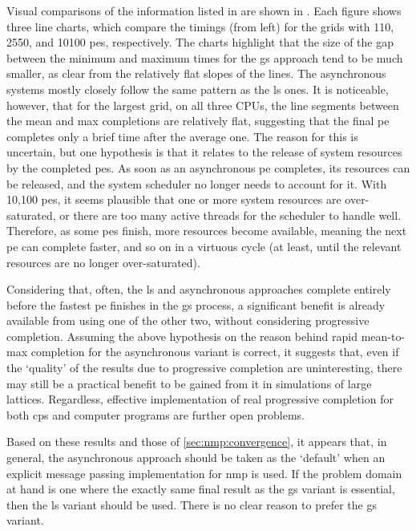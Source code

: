 Visual comparisons of the information listed in  are shown in .  Each figure shows three line charts, which compare the timings (from left) for the grids with \num{110}, \num{2 550}, and \num{10 100} \glspl{pe}, respectively.  The charts highlight that the size of the gap between the minimum and maximum times for the \gls{gs} approach tend to be much smaller, as clear from the relatively flat slopes of the lines.  The asynchronous systems mostly closely follow the same pattern as the \gls{ls} ones.  It is noticeable, however, that for the largest grid, on all three CPUs, the line segments between the mean and max completions are relatively flat, suggesting that the final \gls{pe} completes only a brief time after the average one.  The reason for this is uncertain, but one hypothesis is that it relates to the release of system resources by the completed \glspl{pe}.  As soon as an asynchronous \gls{pe} completes, its resources can be released, and the system scheduler no longer needs to account for it.  With 10,100 \glspl{pe}, it seems plausible that one or more system resources are over-saturated, or there are too many active threads for the scheduler to handle well.  Therefore, as some \glspl{pe} finish, more resources become available, meaning the next \gls{pe} can complete faster, and so on in a virtuous cycle (at least, until the relevant resources are no longer over-saturated).

Considering that, often, the \gls{ls} and asynchronous approaches complete entirely before the fastest \gls{pe} finishes in the \gls{gs} process, a significant benefit is already available from using one of the other two, without considering progressive completion.  Assuming the above hypothesis on the reason behind rapid mean-to-max completion for the asynchronous variant is correct, it suggests that, even if the `quality' of the results due to progressive completion are uninteresting, there may still be a practical benefit to be gained from it in simulations of large lattices.  Regardless, effective implementation of real progressive completion for both \gls{cps} and computer programs are further open problems.

Based on these results and those of \autoref{sec:nmp:convergence}, it appears that, in general, the asynchronous approach should be taken as the `default' when an explicit message passing implementation for \gls{nmp} is used.  If the problem domain at hand is one where the exactly same final result as the \gls{gs} variant is essential, then the \gls{ls} variant should be used.  There is no clear reason to prefer the \gls{gs} variant.

